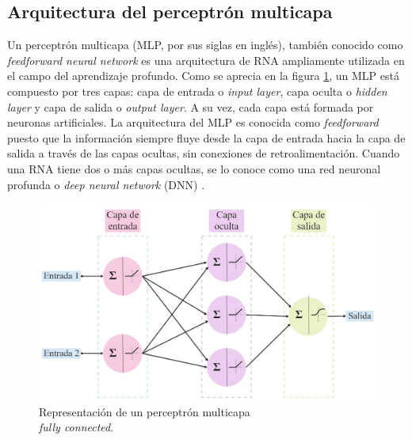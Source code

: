 
\subsection{Arquitectura del perceptrón multicapa}

Un perceptrón multicapa (MLP, por sus siglas en inglés), también conocido como \emph{feedforward neural network} es 
una arquitectura de RNA ampliamente utilizada en el campo del aprendizaje profundo. Como se aprecia en la figura \ref{fig:MLP}, 
un MLP está compuesto por tres capas: capa de entrada o \emph{input layer}, capa oculta 
o \emph{hidden layer} y capa de salida o \emph{output layer}. 
A su vez, cada capa está formada por neuronas artificiales. La arquitectura del MLP es conocida como \emph{feedforward} 
puesto que la información siempre fluye desde la capa de entrada hacia la capa de salida a través de las capas ocultas, 
sin conexiones de retroalimentación. Cuando una RNA tiene dos o más capas ocultas, se lo conoce como una red neuronal 
profunda o \emph{deep neural network} (DNN) \citep{CITE:35} \citep{CITE:44}. 

\begin{figure}[h!]
	\centering
	\includegraphics[width=\textwidth]{./Figures/MLP.jpg}
	\caption{Representación de un perceptrón multicapa \\ \emph{fully connected}\protect\footnotemark.}
	\label{fig:MLP}
\end{figure}

